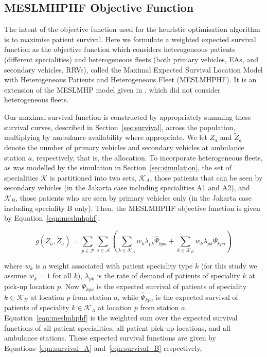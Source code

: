 \documentclass[preprint,12pt]{elsarticle}
\begin{document}
\subsection{MESLMHPHF Objective Function}\label{sec:objective_function}
The intent of the objective function used for the heuristic optimisation algorithm is to maximise patient survival. Here we formulate a weighted expected survival function as the objective function which considers heterogeneous patients (different specialities) and heterogeneous fleets (both primary vehicles, EAs, and secondary vehicles, RRVs), called the Maximal Expected Survival Location Model with Heterogeneous Patients and Heterogeneous Fleet (MESLMHPHF). It is an extension of the MESLMHP model given in \cite{Knight2012918}, which did not consider heterogeneous fleets.

Our maximal survival function is constructed by appropriately summing these survival curves, described in Section~\ref{sec:survival}, across the population, multiplying by ambulance availability where appropriate.
We let $Z_a$ and $\tilde{Z}_a$ denote the number of primary vehicles and secondary vehicles at ambulance station $a$, respectively, that is, the allocation. To incorporate heterogeneous fleets, as was modelled by the simulation in Section~\ref{sec:simulation}, the set of specialities $\mathcal{K}$ is partitioned into two sets, $\mathcal{K}_A$, those patients that can be seen by secondary vehicles (in the Jakarta case including specialities A1 and A2), and $\mathcal{K}_B$, those patients who are seen by primary vehicles only (in the Jakarta case including speciality B only). Then, the MESLMHPHF objective function is given by Equation~\ref{eqn:meslmhphf},

\begin{equation}\label{eqn:meslmhphf}
g\left(Z_a, \tilde{Z}_a\right) = \sum_{p \in \mathcal{P}} \sum_{a \in \mathcal{A}} \left( \sum_{k \in \mathcal{K}_A}  w_k \lambda_{pk} \hat{\Psi}_{kpa} + \sum_{k \in \mathcal{K}_B}  w_k \lambda_{pk} \Psi_{kpa} \right)
\end{equation}

where $w_k$ is a weight associated with patient speciality type $k$ (for this study we assume $w_k = 1$ for all $k$), $\lambda_{pk}$ is the rate of demand of patients of speciality $k$ at pick-up location $p$. Now $\Psi_{kpa}$ is the expected survival of patients of speciality $k \in \mathcal{K}_B$ at location $p$ from station $a$, while $\hat{\Psi}_{kpa}$ is the expected survival of patients of speciality $k \in \mathcal{K}_A$ at location $p$ from station $a$. Equation~\ref{eqn:meslmhphf} is the weighted sum over the expected survival functions of all patient specialities, all patient pick-up locations, and all ambulance stations. These expected survival functions are given by Equations~\ref{eqn:survival_A} and~\ref{eqn:survival_B} respectively,
\end{document}
